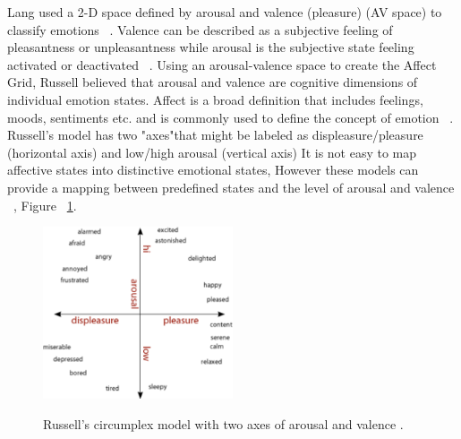 \documentclass{uofsthesis-cs}
\begin{document}
Lang used a 2-D space defined by arousal and valence (pleasure) (AV space) to classify emotions ~\cite{lang1995emotion}. Valence can be described as a subjective feeling of pleasantness or unpleasantness while arousal is the subjective state feeling activated or deactivated ~\cite{barrett1998discrete}. Using an arousal-valence space to create the Affect Grid, Russell believed that arousal and valence are cognitive dimensions of individual emotion states. Affect is a broad definition that includes feelings, moods, sentiments etc. and is commonly used to define the concept of emotion ~\cite{picard2003affective}. Russell's model has two "axes"that might be labeled as displeasure/pleasure (horizontal axis) and low/high arousal (vertical axis) It is not easy to map affective states into distinctive emotional states, However these models can provide a mapping between predefined states and the level of arousal and valence ~\cite{zagalo2004story}, Figure ~\ref{fig:russelavspace}.

\begin{figure}[h!]
  \caption[Russell's arousal and valence model]
  {Russell's circumplex model with two axes of arousal and valence \footnotemark.}
  \centering
  \includegraphics[width=0.5\textwidth]{images/russell-av-space.pdf}
  \label{fig:russelavspace}
\end{figure}

\end{document}
